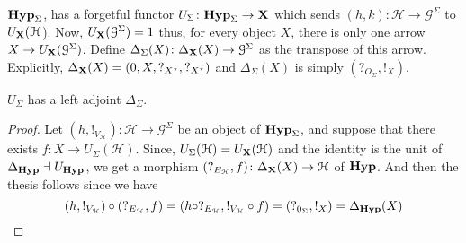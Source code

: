 \documentclass[a4paper,UKenglish,cleveref,pdftex,thm-restate,numberwithinsect]{lipics-v2021}
\newcommand{\lgh}{\mathsf{lg}}
\def\X{\textbf {\textup{X}}}
\newcommand{\catname}[1]{\textbf{\textup{#1}}}
\newcommand{\hyp}{\catname{Hyp}}
\newcommand{\ari}{\mathsf{ar}}
\begin{document}

$\hyp_{\Sigma}$, has a forgetful functor $U_{\Sigma}\colon \hyp_{\Sigma}\to \X$ which sends $(h,k)\colon \mathcal{H}\to \mathcal{G}^{\Sigma}$ to $U_{\X}(\mathcal{H}$). Now, $U_{\X}(\mathcal{G}^{\Sigma})=1$ thus, for every object $X$, there is only one arrow $X\to U_{\X}(\mathcal{G}^{\Sigma})$. Define $\Delta_{\Sigma}(X)\colon \Delta_{\X}(X)\to \mathcal{G}^{\Sigma}$ as the transpose of this arrow. Explicitly, $\Delta_{\X}(X)=(0, X, ?_{X^\star}, ?_{X^\star})$ and $\Delta_\Sigma(X)$ is simply $(?_{O_\Sigma}, !_{X})$.

\begin{proposition} $U_\Sigma$
	has a left adjoint $\Delta_\Sigma$.
\end{proposition}
\begin{proof}Let $(h, !_{V_\mathcal{H}})\colon \mathcal{H}\to \mathcal{G}^{\Sigma}$ be an object of $\hyp_{\Sigma}$, and suppose that there exists $f\colon X\to U_{\Sigma}(\mathcal{H})$. Since, $U_{\Sigma}(\mathcal{H})=U_{\X}(\mathcal{H})$ and the identity is the unit of $\Delta_\hyp \dashv U_{\hyp}$, we get a morphism $(?_{E_{\mathcal{H}}},f)\colon \Delta_{\X}(X)\to \mathcal{H}$ of $\hyp$. And then the thesis follows since we have
	\[
	(h, !_{V_{\mathcal{{H}}}})\circ (?_{E_{\mathcal{H}}}, f)=(h\circ ?_{E_{\mathcal{H}}}, !_{V_{\mathcal{{H}}}}\circ f)=(?_{0_{\Sigma}}, !_{X})=\Delta_{\hyp}(X)\]
\end{proof}
\end{document}

